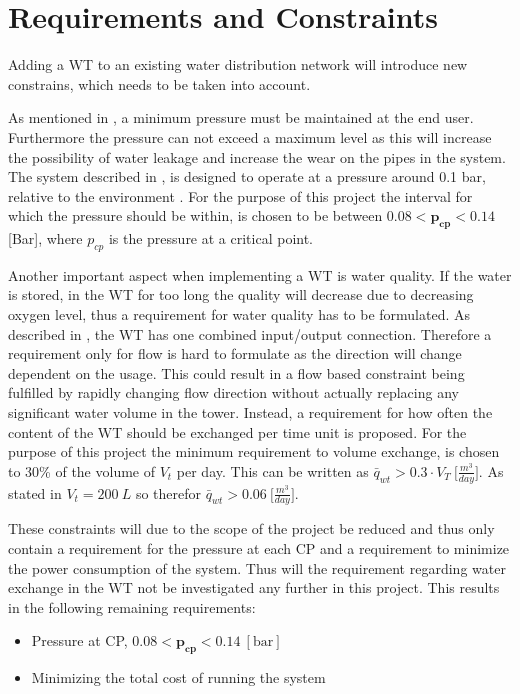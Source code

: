 \chapter{Requirements and Constraints}
\label{Requirements_and_constraints}

Adding a WT to an existing water distribution network will introduce new constrains, which needs to be taken into account. 

As mentioned in , a minimum pressure must be maintained at the end user. Furthermore the pressure can not exceed a maximum level as this will increase the possibility of water leakage and increase the wear on the pipes in the system. The system described in , is designed to operate at a pressure around 0.1 bar, relative to the environment \cite{master_aau}. For the purpose of this project the interval for which the pressure should be within, is chosen to be between $0.08 < \pmb{p_{cp}} < 0.14$ [Bar], where $p_{cp}$ is the pressure at a critical point.

Another important aspect when implementing a WT is water quality. If the water is stored, in the WT for too long the quality will decrease due to decreasing oxygen level, thus a requirement for water quality has to be formulated. As described in , the WT has one combined input/output connection. Therefore a requirement only for flow is hard to formulate as the direction will change dependent on the usage. This could result in a flow based constraint being fulfilled by rapidly changing flow direction without actually replacing any significant water volume in the tower. Instead, a requirement for how often the content of the WT should be exchanged per time unit is proposed. For the purpose of this project the minimum requirement to volume exchange, is chosen to 30\% of the volume of $V_t$ per day. This can be written as $\bar{q}_{wt} > 0.3\cdot V_T \: \big[\frac{m^3}{day}\big]$. As stated in  $V_t = 200 \:L$ so therefor $\bar{q}_{wt} > 0.06 \: \big[\frac{m^3}{day}\big]$.

These constraints will due to the scope of the project be reduced and thus only contain a requirement for the pressure at each CP and a requirement to minimize the power consumption of the system. Thus will the requirement regarding water exchange in the WT not be investigated any further in this project. 
This results in the following remaining requirements:

\begin{itemize}
	\item Pressure at CP, $0.08 < \pmb{p_{cp}} < 0.14 \:[\text{bar}]$
%
	\item Minimizing the total cost of running the system
\end{itemize}
 